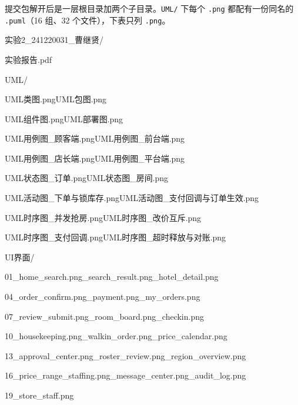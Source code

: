 提交包解开后是一层根目录加两个子目录。\texttt{UML/} 下每个 \texttt{.png} 都配有一份同名的 \texttt{.puml}（16 组、32 个文件），下表只列 \texttt{.png}。

{\ttfamily\raggedright
\noindent 实验2\_241220031\_曹继贤/\par
\noindent\hspace*{2em}实验报告.pdf\par
\noindent\hspace*{2em}UML/\par
\noindent\hspace*{4em}UML类图.png\qquad UML包图.png\par
\noindent\hspace*{4em}UML组件图.png\qquad UML部署图.png\par
\noindent\hspace*{4em}UML用例图\_顾客端.png\qquad UML用例图\_前台端.png\par
\noindent\hspace*{4em}UML用例图\_店长端.png\qquad UML用例图\_平台端.png\par
\noindent\hspace*{4em}UML状态图\_订单.png\qquad UML状态图\_房间.png\par
\noindent\hspace*{4em}UML活动图\_下单与锁库存.png\qquad UML活动图\_支付回调与订单生效.png\par
\noindent\hspace*{4em}UML时序图\_并发抢房.png\qquad UML时序图\_改价互斥.png\par
\noindent\hspace*{4em}UML时序图\_支付回调.png\qquad UML时序图\_超时释放与对账.png\par
\noindent\hspace*{2em}UI界面/\par
\noindent\hspace*{4em}01\_home\_search.png\_search\_result.png\_hotel\_detail.png\par
\noindent\hspace*{4em}04\_order\_confirm.png\_payment.png\_my\_orders.png\par
\noindent\hspace*{4em}07\_review\_submit.png\_room\_board.png\_checkin.png\par
\noindent\hspace*{4em}10\_housekeeping.png\_walkin\_order.png\_price\_calendar.png\par
\noindent\hspace*{4em}13\_approval\_center.png\_roster\_review.png\_region\_overview.png\par
\noindent\hspace*{4em}16\_price\_range\_staffing.png\_message\_center.png\_audit\_log.png\par
\noindent\hspace*{4em}19\_store\_staff.png\par
}

